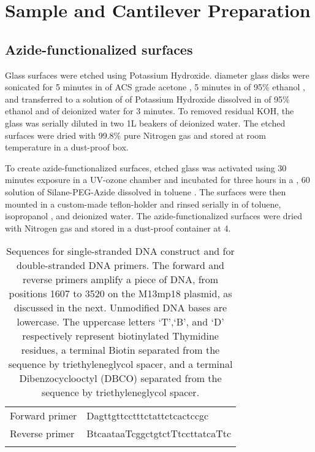 \chapter{Sample and Cantilever Preparation}

\section{Azide-functionalized surfaces}

Glass surfaces were etched using Potassium Hydroxide.  diameter glass disks  were sonicated  for 5 minutes in  of ACS grade acetone , 5 minutes in  of 95\% ethanol , and transferred to a solution of  of Potassium Hydroxide  dissolved in   of 95\% ethanol and  of deionized water  for 3 minutes. To removed residual KOH, the glass was serially diluted in two 1L beakers of  deionized water. The etched surfaces were dried with 99.8\% pure Nitrogen gas  and stored at room temperature in a dust-proof box. 

To create azide-functionalized surfaces, etched glass was activated using 30 minutes exposure in a UV-ozone chamber  and incubated for three hours in a , 60\degreeC{} solution of   Silane-PEG-Azide  dissolved in toluene . The surfaces were then mounted in a custom-made teflon-holder and rinsed serially in  of toluene, isopropanol , and deionized water. The azide-functionalized surfaces were dried with Nitrogen gas and stored in a dust-proof container at 4\degreeC{}.  


\begin{table}[htp]
\caption[DNA primer sequences]{Sequences for single-stranded DNA construct and for double-stranded DNA primers. The forward and reverse primers amplify a  piece of DNA, from positions 1607 to 3520 on the M13mp18 plasmid, as discussed in the next. Unmodified DNA bases are lowercase. The uppercase letters `T',`B', and `D' respectively represent biotinylated Thymidine residues, a terminal Biotin separated from the sequence by triethyleneglycol spacer, and a terminal Dibenzocyclooctyl (DBCO) separated from the sequence by triethyleneglycol spacer.}
\begin{tabularx}{\textwidth}{ l | l  }
\hline \hline
Forward primer & Dagttgttcctttctattctcactccgc \\ \e 
Reverse primer & BtcaataaTcggctgtctTtccttatcaTtc \\ \e 
\end{tabularx}
\end{table}


